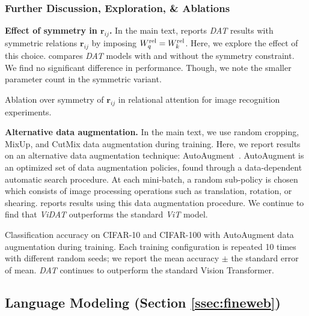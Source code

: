 \subsubsection*{Further Discussion, Exploration, \& Ablations}

\textbf{Effect of symmetry in $\bm{r}_{ij}$.} In the main text,  reports \textit{DAT} results with symmetric relations $\bm{r}_{ij}$ by imposing $W_q^{\mathrm{rel}} = W_k^{\mathrm{rel}}$. Here, we explore the effect of this choice.  compares \textit{DAT} models with and without the symmetry constraint. We find no significant difference in performance. Though, we note the smaller parameter count in the symmetric variant.

\begin{table}
    \resizebox{\textwidth}{!}{
    
    }
    \vskip5pt
    \caption{Ablation over symmetry of $\bm{r}_{ij}$ in relational attention for image recognition experiments.}\label{tab:cifar_results_symmetry_ablation}
\end{table}

\textbf{Alternative data augmentation.} In the main text, we use random cropping, MixUp, and CutMix data augmentation during training. Here, we report results on an alternative data augmentation technique: AutoAugment~\citep{cubuk2019autoaugmentlearningaugmentationpolicies}. AutoAugment is an optimized set of data augmentation policies, found through a data-dependent automatic search procedure. At each mini-batch, a random sub-policy is chosen which consists of image processing operations such as translation, rotation, or shearing.  reports results using this data augmentation procedure. We continue to find that \textit{ViDAT} outperforms the standard \textit{ViT} model.

\begin{table}
    
    \vskip5pt
    \caption{Classification accuracy on CIFAR-10 and CIFAR-100 with AutoAugment data augmentation during training. Each training configuration is repeated 10 times with different random seeds; we report the mean accuracy $\pm$ the standard error of mean. \textit{DAT} continues to outperform the standard Vision Transformer.}\label{tab:cifar_results_autoaugment}
\end{table}

\subsection{Language Modeling (Section \ref{ssec:fineweb})}\label{ssec:appendix_fineweb}

